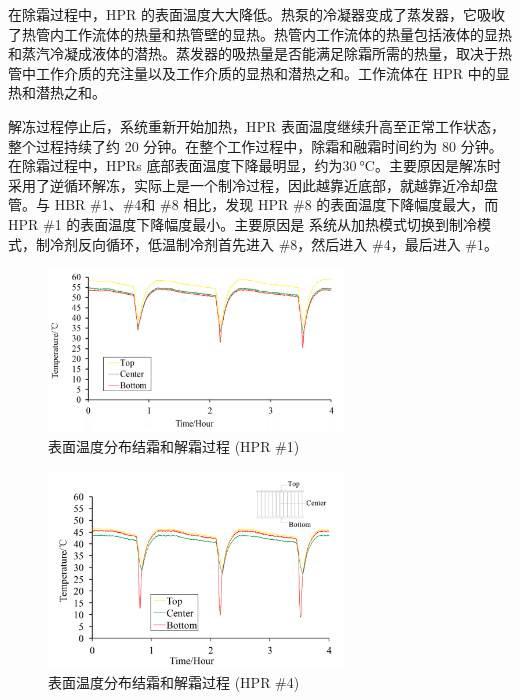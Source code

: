 在除霜过程中，HPR 的表面温度大大降低。热泵的冷凝器变成了蒸发器，它吸收了热管内工作流体的热量和热管壁的显热。热管内工作流体的热量包括液体的显热和蒸汽冷凝成液体的潜热。蒸发器的吸热量是否能满足除霜所需的热量，取决于热管中工作介质的充注量以及工作介质的显热和潜热之和。工作流体在 HPR 中的显热和潜热之和。

解冻过程停止后，系统重新开始加热，HPR 表面温度继续升高至正常工作状态，整个过程持续了约 20 分钟。在整个工作过程中，除霜和融霜时间约为 80 分钟。在除霜过程中，HPRs 底部表面温度下降最明显，约为$\qty{30}{\degreeCelsius} $。主要原因是解冻时采用了逆循环解冻，实际上是一个制冷过程，因此越靠近底部，就越靠近冷却盘管。与 HBR \#1、\#4和 \#8 相比，发现 HPR 
\#8 的表面温度下降幅度最大，而 HPR \#1 的表面温度下降幅度最小。主要原因是 系统从加热模式切换到制冷模式，制冷剂反向循环，低温制冷剂首先进入 \#8，然后进入 \#4，最后进入 \#1。

\begin{figure}[htbp]
	\centering
	\includegraphics[width=0.7\textwidth]{picture/picture_11}
	\caption{表面温度分布结霜和解霜过程 (HPR \#1)}
	\label{F:11}
\end{figure}

\begin{figure}[htbp]
	\centering
	\includegraphics[width=0.7\textwidth]{picture/picture_12}
	\caption{表面温度分布结霜和解霜过程 (HPR \#4)}
	\label{F:12}
\end{figure}

